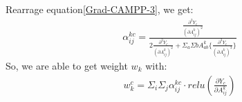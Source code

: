\documentclass[conference]{IEEEtran}
\begin{document}
	Rearrage equation\ref{Grad-CAMPP-3}, we get:
	\begin{equation}
		\begin{aligned}
			\alpha_{ij}^{kc}=\frac{\frac{\partial^{2} Y_{c}}{(\partial A_{ij}^{k})^{2}}}{2\frac{\partial^{2} Y_{c}}{(\partial A_{ij}^{k})^{2}}+\Sigma_{a}\Sigma{b}A_{ab}^{k}\{\frac{\partial^{3} Y_{c}}{(\partial A_{ij}^{k})^{3}}\}}
			\label{Grad-CAMPP-4}
		\end{aligned}
	\end{equation}
	So, we are able to get weight $w_{k}$ with:
	\begin{equation}
		\begin{aligned}
			w_{k}^{c}=\Sigma_{i}\Sigma_{j}\alpha_{ij}^{kc}·relu(\frac{\partial Y_{c}}{\partial A_{ij}^{k}})
			\label{Grad-CAMPP-5}
		\end{aligned}
	\end{equation}
	
\end{document}
